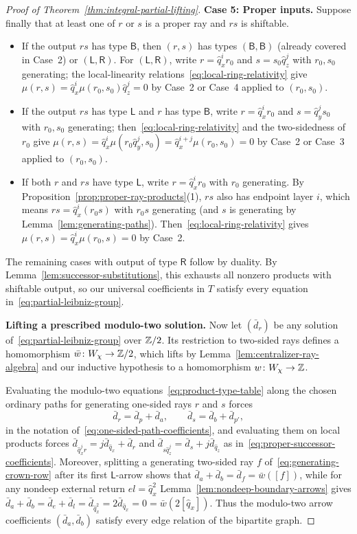 \begin{proof}[Proof of Theorem~\ref{thm:integral-partial-lifting}]
\smallskip
\noindent\textbf{Case 5: Proper inputs.}
Suppose finally that at least one of $r$ or $s$ is a proper ray and $rs$ is shiftable.
\begin{itemize}
\item If the output $rs$ has type $\mathsf B$, then $(r,s)$ has types $(\mathsf B,\mathsf B)$ (already covered in Case~2) or $(\mathsf L,\mathsf R)$. For $(\mathsf L,\mathsf R)$, write $r=\widehat q_x^ir_0$ and $s=s_0\widehat q_z^j$ with $r_0,s_0$ generating; the local-linearity relations~\eqref{eq:local-ring-relativity} give $\mu(r,s)=\widehat q_x^i\mu(r_0,s_0)\widehat q_z^j=0$ by Case~2 or Case~4 applied to $(r_0,s_0)$.
\item If the output $rs$ has type $\mathsf L$ and $r$ has type $\mathsf B$, write $r=\widehat q_x^ir_0$ and $s=\widehat q_y^js_0$ with $r_0,s_0$ generating; then~\eqref{eq:local-ring-relativity} and the two-sidedness of $r_0$ give $\mu(r,s)=\widehat q_x^i\mu(r_0\widehat q_y^j,s_0)=\widehat q_x^{i+j}\mu(r_0,s_0)=0$ by Case~2 or Case~3 applied to $(r_0,s_0)$.
\item If both $r$ and $rs$ have type $\mathsf L$, write $r=\widehat q_x^ir_0$ with $r_0$ generating. By Proposition~\ref{prop:proper-ray-products}(1), $rs$ also has endpoint layer $i$, which means $rs=\widehat q_x^i(r_0s)$ with $r_0s$ generating (and $s$ is generating by Lemma~\ref{lem:generating-paths}). Then~\eqref{eq:local-ring-relativity} gives $\mu(r,s)=\widehat q_x^i\mu(r_0,s)=0$ by Case~2.
\end{itemize}
The remaining cases with output of type $\mathsf R$ follow by duality. By Lemma~\ref{lem:successor-substitutions}, this exhausts all nonzero products with shiftable output, so our universal coefficients in $T$ satisfy every equation in~\eqref{eq:partial-leibniz-group}.

\smallskip
\noindent\textbf{Lifting a prescribed modulo-two solution.}
Now let $(\bar d_r)$ be any solution of~\eqref{eq:partial-leibniz-group} over $\mathbb Z/2$. Its restriction to two-sided rays defines a homomorphism $\bar w\colon W_\chi\to\mathbb Z/2$, which lifts by Lemma~\ref{lem:centralizer-ray-algebra} and our inductive hypothesis to a homomorphism $w\colon W_\chi\to\mathbb Z$.

Evaluating the modulo-two equations~\eqref{eq:product-type-table} along the chosen ordinary paths for generating one-sided rays $r$ and $s$ forces
\[
  \bar d_r=\bar d_p+\bar d_a,\qquad \bar d_s=\bar d_b+\bar d_{p'},
\]
in the notation of~\eqref{eq:one-sided-path-coefficients}, and evaluating them on local products forces $\bar d_{\widehat q_x^jr}=j\bar d_{\widehat q_x}+\bar d_r$ and $\bar d_{s\widehat q_z^j}=\bar d_s+j\bar d_{\widehat q_z}$ as in~\eqref{eq:proper-successor-coefficients}. Moreover, splitting a generating two-sided ray $f$ of~\eqref{eq:generating-crown-row} after its first $\mathsf L$-arrow shows that $\bar d_a+\bar d_b=\bar d_f=\bar w([f])$, while for any nondeep external return $el=\widehat q_x^2$ Lemma~\ref{lem:nondeep-boundary-arrows} gives $\bar d_a+\bar d_b=\bar d_e+\bar d_l=\bar d_{\widehat q_x^2}=2\bar d_{\widehat q_x}=0=\bar w(2[\widehat q_x])$. Thus the modulo-two arrow coefficients $(\bar d_a,\bar d_b)$ satisfy every edge relation of the bipartite graph.


\end{proof}
